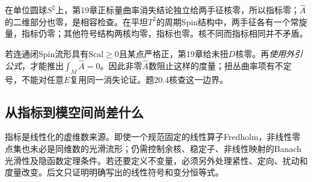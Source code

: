在单位圆球$S^2$上，第19章正标量曲率消失结论独立给两手征核零，所以指标零；$\widehat A$的二维部分也零，是相容检查。在平坦$T^2$的周期Spin结构中，两手征各有一个常旋量，指标仍零；其他符号结构两核均零，指标也零。核不同而指标相同并不矛盾。

若连通闭Spin流形具有$\mathrm{Scal}\geq0$且某点严格正，第19章给未扭$D$核零。再\emph{使用外引公式}，才能推出$\int_M\widehat A=0$。因此非零$\widehat A$数阻止这样的度量；扭丛曲率项有不定号，不能对任意$E$复用同一消失论证。题20.4核查这一边界。

\subsection{从指标到模空间尚差什么}
指标是线性化的虚维数来源。即使一个规范固定的线性算子Fredholm，非线性零点集也未必是同维数的光滑流形；仍需控制余核、稳定子、非线性映射的Banach光滑性及隐函数定理条件。若还要定义不变量，必须另外处理紧性、定向、扰动和度量改变。后文只证明明确写出的线性符号和变分恒等式。
